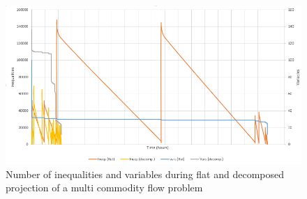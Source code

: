 \begin{figure}
	\centering
		\includegraphics[scale=0.6]{figures/multicom.PNG}
	\caption{Number of inequalities and variables during flat and decomposed projection of a multi commodity flow problem}
	\label{fig:multicom}
\end{figure}


%


